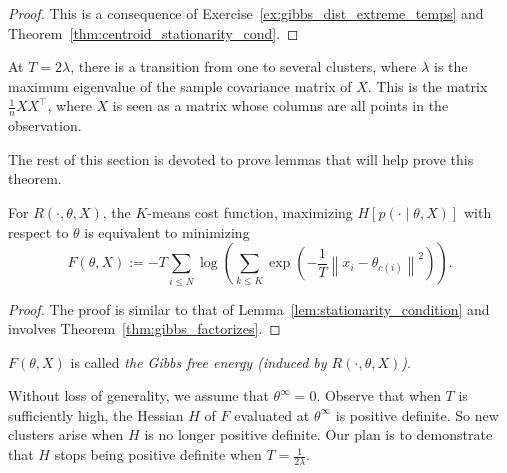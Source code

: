 \begin{proof}
This is a consequence of Exercise~\ref{ex:gibbs_dist_extreme_temps} and Theorem~\ref{thm:centroid_stationarity_cond}.
\end{proof}

\begin{theorem}
At $T = 2\lambda$, there is a transition from one to several clusters, where $\lambda$ is the maximum eigenvalue of the sample covariance matrix of $X$. This is the matrix $\frac{1}{n}XX^\top$, where $X$ is seen as a matrix whose columns are all points in the observation.
\label{thm:critical_temp_da}
\end{theorem}

The rest of this section is devoted to prove lemmas that will help prove
this theorem.


\begin{lemma}
For $R(\cdot, \theta, X)$, the $K$-means cost function, maximizing $H[p(\cdot \mid \theta, X)]$ with respect to $\theta$ is equivalent to minimizing
%
\begin{equation}
F(\theta, X) := -T \sum_{i \leq N}\log \left(\sum_{k \leq K}\exp\left(-\frac{1}{T}\left\|x_i - \theta_{c(i)}\right\|^2\right)\right).
\label{eq:gibbs_free_energy_da}
\end{equation}
%
\label{lem:max_ent_is_min_free_energy_da}
\end{lemma}

\begin{proof}
The proof is similar to that of Lemma~\ref{lem:stationarity_condition} and involves Theorem~\ref{thm:gibbs_factorizes}.
\end{proof}

$F\left(\theta, X\right)$ is called \emph{the Gibbs free energy (induced by $R(\cdot, \theta, X)$)}.

Without loss of generality, we assume that $\theta^\infty = 0$. Observe that
when $T$ is sufficiently high, the Hessian $H$ of $F$ evaluated at $\theta^\infty$ is positive
definite. So new clusters arise when $H$ is no longer positive definite. Our plan is to demonstrate that $H$ stops being positive definite when $T = \frac{1}{2\lambda}$.

